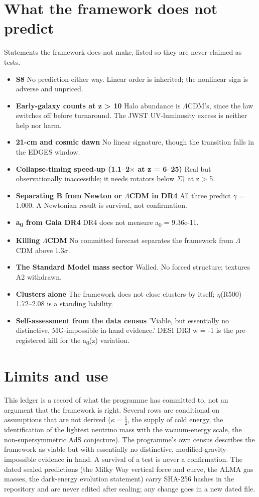 \documentclass[10pt]{article}
\begin{document}
\section{What the framework does not predict}
Statements the framework does not make, listed so they are never claimed as tests.

\begin{itemize}
\item \textbf{S8} No prediction either way. Linear order is inherited; the nonlinear sign is adverse and unpriced.
\item \textbf{Early-galaxy counts at z > 10} Halo abundance is \ensuremath{\Lambda}CDM's, since the law switches off before turnaround. The JWST UV-luminosity excess is neither help nor harm.
\item \textbf{21-cm and cosmic dawn} No linear signature, though the transition falls in the EDGES window.
\item \textbf{Collapse-timing speed-up (1.1--2\ensuremath{\times} at z = 6--25)} Real but observationally inaccessible; it needs rotators below \ensuremath{\Sigma}\ensuremath{\dagger} at z > 5.
\item \textbf{Separating B from Newton or \ensuremath{\Lambda}CDM in DR4} All three predict \ensuremath{\gamma} = 1.000. A Newtonian result is survival, not confirmation.
\item \textbf{a\textsubscript{0} from Gaia DR4} DR4 does not measure a\textsubscript{0} = 9.36e-11.
\item \textbf{Killing \ensuremath{\Lambda}CDM} No committed forecast separates the framework from \ensuremath{\Lambda}CDM above 1.3\ensuremath{\sigma}.
\item \textbf{The Standard Model mass sector} Walled. No forced structure; textures A2 withdrawn.
\item \textbf{Clusters alone} The framework does not close clusters by itself; \ensuremath{\eta}(R500) 1.72--2.08 is a standing liability.
\item \textbf{Self-assessment from the data census} 'Viable, but essentially no distinctive, MG-impossible in-hand evidence.' DESI DR3 w = -1 is the pre-registered kill for the a\textsubscript{0}(z) variation.
\end{itemize}

\section{Limits and use}
This ledger is a record of what the programme has committed to, not an argument that the framework is right. Several rows are conditional on assumptions that are not derived ($\kappa=\tfrac12$, the supply of cold energy, the identification of the lightest neutrino mass with the vacuum-energy scale, the non-supersymmetric AdS conjecture). The programme's own census describes the framework as viable but with essentially no distinctive, modified-gravity-impossible evidence in hand. A survival of a test is never a confirmation. The dated sealed predictions (the Milky Way vertical force and curve, the ALMA gas masses, the dark-energy evolution statement) carry SHA-256 hashes in the repository and are never edited after sealing; any change goes in a new dated file.
\end{document}
